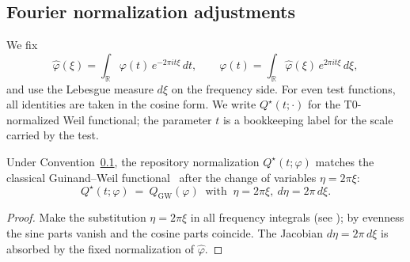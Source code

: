 
\newcommand{\aarch}{a} %
\newcommand{\xilog}{\xi_n} %

\subsection{Fourier normalization adjustments}\label{conv:fourier}
We fix
\begin{equation}\label{eq:T0_Q_normalization-formula-4}
  \widehat{\varphi}(\xi)=\int_{\mathbb R}\varphi(t)\,e^{-2\pi i t \xi}\,dt,
  \qquad
  \varphi(t)=\int_{\mathbb R}\widehat{\varphi}(\xi)\,e^{2\pi i t \xi}\,d\xi,
\end{equation}
and use the Lebesgue measure $d\xi$ on the frequency side. For even test functions, all identities are taken in the cosine form.
We write $Q^\star(t;\cdot)$ for the T0-normalized Weil functional; the parameter $t$ is a bookkeeping label for the scale carried by the test.

\begin{proposition}\label{prop:T0-GW}
Under Convention~\ref{conv:fourier}, the repository normalization $Q^\star(t;\varphi)$ matches the classical Guinand--Weil functional~\cite{Guinand1948,Weil1952} after the change of variables $\eta=2\pi\xi$:
\begin{equation}\label{eq:T0_Q_normalization-q-functional}
  Q^\star(t;\varphi)\ =\ Q_{\mathrm{GW}}(\varphi)\ \text{ with } \ \eta=2\pi\xi,\ d\eta=2\pi\,d\xi.
\end{equation}
\end{proposition}
\begin{proof}
Make the substitution $\eta=2\pi\xi$ in all frequency integrals (see \cite[Ch.~2]{SteinShakarchi2003}); by evenness the sine parts vanish and the cosine parts coincide. The Jacobian $d\eta=2\pi\,d\xi$ is absorbed by the fixed normalization of $\widehat{\varphi}$.
\end{proof}


